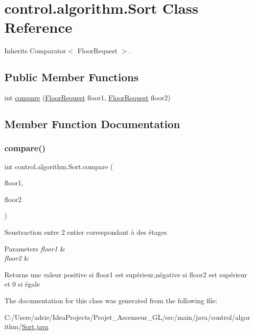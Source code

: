 \hypertarget{classcontrol_1_1algorithm_1_1_sort}{}\section{control.\+algorithm.\+Sort Class Reference}
\label{classcontrol_1_1algorithm_1_1_sort}


Inherits Comparator$<$ Floor\+Request $>$.

\subsection*{Public Member Functions}
\begin{DoxyCompactItemize}
\item 
int \mbox{\hyperlink{classcontrol_1_1algorithm_1_1_sort_a7b8bfc4d73475992e728addc4cc7c9a4}{compare}} (\mbox{\hyperlink{classcontrol_1_1command_1_1_floor_request}{Floor\+Request}} floor1, \mbox{\hyperlink{classcontrol_1_1command_1_1_floor_request}{Floor\+Request}} floor2)
\end{DoxyCompactItemize}


\subsection{Member Function Documentation}
\mbox{\label{classcontrol_1_1algorithm_1_1_sort_a7b8bfc4d73475992e728addc4cc7c9a4}} 
\subsubsection{\texorpdfstring{compare()}{compare()}}
{\footnotesize\ttfamily int control.\+algorithm.\+Sort.\+compare (\begin{DoxyParamCaption}\item[{\mbox{\hyperlink{classcontrol_1_1command_1_1_floor_request}{Floor\+Request}}}]{floor1,  }\item[{\mbox{\hyperlink{classcontrol_1_1command_1_1_floor_request}{Floor\+Request}}}]{floor2 }\end{DoxyParamCaption})}

Soustraction entre 2 entier correspondant à des étages 
\begin{DoxyParams}{Parameters}
{\em floor1} & \\
\hline
{\em floor2} & \\
\hline
\end{DoxyParams}
\begin{DoxyReturn}{Returns}
une valeur positive si floor1 est supérieur,négative si floor2 est supérieur et 0 si égale 
\end{DoxyReturn}


The documentation for this class was generated from the following file\+:\begin{DoxyCompactItemize}
\item 
C\+:/\+Users/adrie/\+Idea\+Projects/\+Projet\+\_\+\+Ascenseur\+\_\+\+G\+L/src/main/java/control/algorithm/\mbox{\hyperlink{_sort_8java}{Sort.\+java}}\end{DoxyCompactItemize}
